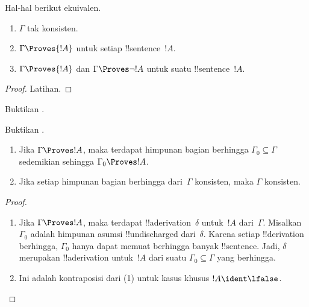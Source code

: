 \documentclass[../../../include/open-logic-section]{subfiles}
\begin{document}
\begin{prop}
Hal-hal berikut ekuivalen.
    \begin{enumerate}
      \item \( \Gamma \) tak konsisten.
      \item \( \Gamma \Proves {!A} \) untuk setiap !!{sentence}~\( {!A} \).
      \item \( \Gamma \Proves {!A} \) dan \( \Gamma \Proves \lnot {!A} \) untuk suatu !!{sentence}~\( {!A} \).
    \end{enumerate}
\end{prop}

\begin{proof}
Latihan.
\end{proof}

\begin{prob}
Buktikan .
\end{prob}
\tagendprob

\begin{prob}
Buktikan .
\end{prob}
\tagendprob

\begin{prop}[Kekompakan]
  \begin{enumerate}
  \item Jika $\Gamma \Proves !A$, maka terdapat himpunan bagian berhingga
    $\Gamma_0 \subseteq \Gamma$ sedemikian sehingga $\Gamma_0 \Proves !A$.
  \item Jika setiap himpunan bagian berhingga dari~$\Gamma$ konsisten,
    maka $\Gamma$ konsisten.
  \end{enumerate}
\end{prop}

\begin{proof}
  \begin{enumerate}
    \item Jika $\Gamma \Proves !A$, maka terdapat
      !!a{derivation}~$\delta$ untuk~$!A$ dari~$\Gamma$. Misalkan
      $\Gamma_0$ adalah himpunan asumsi !!{undischarged} dari~$\delta$.
      Karena setiap !!{derivation} berhingga, $\Gamma_0$ hanya dapat
      memuat berhingga banyak !!{sentence}. Jadi, $\delta$ merupakan
      !!a{derivation} untuk~$!A$ dari suatu $\Gamma_0 \subseteq \Gamma$
      yang berhingga.
    \item Ini adalah kontraposisi dari (1) untuk kasus khusus
      $!A \ident \lfalse$.
  \end{enumerate}
\end{proof}
\end{document}
